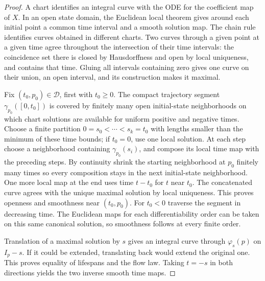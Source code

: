 \documentclass[11pt,oneside,openany]{book}
\theoremstyle{definition}
\theoremstyle{remark}
\begin{document}
\begin{proof}
A chart identifies an integral curve with the ODE for the coefficient map of \(X\). In an open state domain, the Euclidean local theorem gives around each initial point a common time interval and a smooth solution map. The chain rule identifies curves obtained in different charts. Two curves through a given point at a given time agree throughout the intersection of their time intervals: the coincidence set there is closed by Hausdorffness and open by local uniqueness, and contains that time. Gluing all intervals containing zero gives one curve on their union, an open interval, and its construction makes it maximal.

Fix \((t_0,p_0)\in\mathcal D\), first with \(t_0\geq0\). The compact trajectory segment \(\gamma_{p_0}([0,t_0])\) is covered by finitely many open initial-state neighborhoods on which chart solutions are available for uniform positive and negative times. Choose a finite partition \(0=s_0<\cdots<s_k=t_0\) with lengths smaller than the minimum of these time bounds; if \(t_0=0\), use one local solution. At each step choose a neighborhood containing \(\gamma_{p_0}(s_i)\), and compose its local time map with the preceding steps. By continuity shrink the starting neighborhood at \(p_0\) finitely many times so every composition stays in the next initial-state neighborhood. One more local map at the end uses time \(t-t_0\) for \(t\) near \(t_0\). The concatenated curve agrees with the unique maximal solution by local uniqueness. This proves openness and smoothness near \((t_0,p_0)\). For \(t_0<0\) traverse the segment in decreasing time. The Euclidean maps for each differentiability order can be taken on this same canonical solution, so smoothness follows at every finite order.

Translation of a maximal solution by \(s\) gives an integral curve through \(\varphi_s(p)\) on \(I_p-s\). If it could be extended, translating back would extend the original one. This proves equality of lifespans and the flow law. Taking \(t=-s\) in both directions yields the two inverse smooth time maps.
\end{proof}
\end{document}
